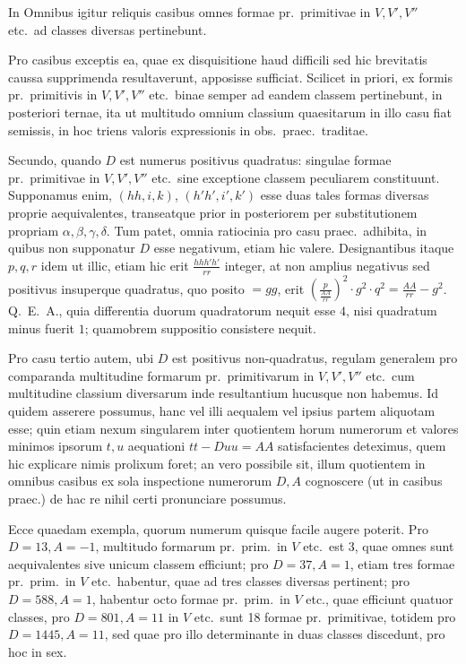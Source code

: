 \documentclass[12pt,a4paper]{article}
\theoremstyle{plain}
\theoremstyle{definition}
\theoremstyle{remark}
\theoremstyle{problemstyle}
\begin{document}
In Omnibus igitur reliquis casibus omnes formae pr.\ primitivae in $V, V', V''$ etc.\ ad classes diversas pertinebunt.

Pro casibus exceptis ea, quae ex disquisitione haud difficili sed hic brevitatis caussa supprimenda resultaverunt, apposisse sufficiat. Scilicet in priori, ex formis pr.\ primitivis in $V, V', V''$ etc.\ binae semper ad eandem classem pertinebunt, in posteriori ternae, ita ut multitudo omnium classium quaesitarum in illo casu fiat semissis, in hoc triens valoris expressionis in obs.\ praec.\ traditae.

Secundo, quando $D$ est numerus positivus quadratus: singulae formae pr.\ primitivae in $V, V', V''$ etc.\ sine exceptione classem peculiarem constituunt. Supponamus enim, $(hh, i, k)$, $(h'h', i', k')$ esse duas tales formas diversas proprie aequivalentes, transeatque prior in posteriorem per substitutionem propriam $\alpha, \beta, \gamma, \delta$. Tum patet, omnia ratiocinia pro casu praec.\ adhibita, in quibus non supponatur $D$ esse negativum, etiam hic valere. Designantibus itaque $p, q, r$ idem ut illic, etiam hic erit $\frac{hhh'h'}{rr}$ integer, at non amplius negativus sed positivus insuperque quadratus, quo posito $= gg$, erit $(\frac{p}{\frac{AA}{rr}})^2 \cdot g^2 \cdot q^2 = \frac{AA}{rr} - g^2$. Q.\ E.\ A., quia differentia duorum quadratorum nequit esse $4$, nisi quadratum minus fuerit $1$; quamobrem suppositio consistere nequit.

Pro casu tertio autem, ubi $D$ est positivus non-quadratus, regulam generalem pro comparanda multitudine formarum pr.\ primitivarum in $V, V', V''$ etc.\ cum multitudine classium diversarum inde resultantium hucusque non habemus. Id quidem asserere possumus, hanc vel illi aequalem vel ipsius partem aliquotam esse; quin etiam nexum singularem inter quotientem horum numerorum et valores minimos ipsorum $t, u$ aequationi $tt - Duu = AA$ satisfacientes deteximus, quem hic explicare nimis prolixum foret; an vero possibile sit, illum quotientem in omnibus casibus ex sola inspectione numerorum $D, A$ cognoscere (ut in casibus praec.) de hac re nihil certi pronunciare possumus.

Ecce quaedam exempla, quorum numerum quisque facile augere poterit. Pro $D = 13, A = -1$, multitudo formarum pr.\ prim.\ in $V$ etc.\ est 3, quae omnes sunt aequivalentes sive unicum classem efficiunt; pro $D = 37, A = 1$, etiam tres formae pr.\ prim.\ in $V$ etc.\ habentur, quae ad tres classes diversas pertinent; pro $D = 588, A = 1$, habentur octo formae pr.\ prim.\ in $V$ etc., quae efficiunt quatuor classes, pro $D = 801, A = 11$ in $V$ etc.\ sunt 18 formae pr.\ primitivae, totidem pro $D = 1445, A = 11$, sed quae pro illo determinante in duas classes discedunt, pro hoc in sex.
\end{document}
